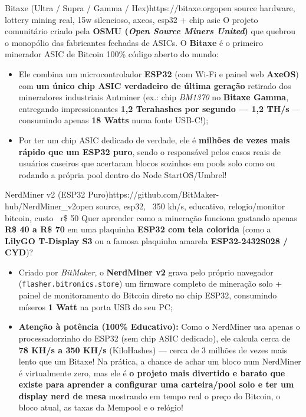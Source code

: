 \documentclass{pousadaguide}
\begin{document}
\begin{ferramenta}[goat,logo=bitaxe]{Bitaxe (Ultra / Supra / Gamma / Hex)}{https://bitaxe.org}{open source hardware, lottery mining real, 15w silencioso, axeos, esp32 + chip asic}
O projeto comunitário criado pela \textbf{OSMU (\emph{Open Source Miners United})} que quebrou o monopólio das fabricantes fechadas de ASICs. O \textbf{Bitaxe} é o primeiro minerador ASIC de Bitcoin 100\% código aberto do mundo:
\begin{itemize}
  \item Ele combina um microcontrolador \textbf{ESP32} (com Wi-Fi e painel web \textbf{AxeOS}) com \textbf{um único chip ASIC verdadeiro de última geração} retirado dos mineradores industriais Antminer (ex.: chip \emph{BM1370} no \textbf{Bitaxe Gamma}, entregando impressionantes \textbf{1,2 Terahashes por segundo — 1,2 TH/s} — consumindo apenas \textbf{18 Watts} numa fonte USB-C!);
  \item Por ter um chip ASIC dedicado de verdade, ele é \textbf{milhões de vezes mais rápido que um ESP32 puro}, sendo o responsável pelos casos reais de usuários caseiros que acertaram blocos sozinhos em pools solo como  ou rodando a própria pool dentro do Node StartOS/Umbrel!
\end{itemize}
\end{ferramenta}

\begin{ferramenta}[recomendado,logo=nerdminer]{NerdMiner v2 (ESP32 Puro)}{https://github.com/BitMaker-hub/NerdMiner_v2}{open source, esp32, ~350 kh/s, educativo, relogio/monitor bitcoin, custo ~r\$ 50}
Quer aprender como a mineração funciona gastando apenas \textbf{R\$ 40 a R\$ 70} em uma plaquinha \textbf{ESP32 com tela colorida} (como a \textbf{LilyGO T-Display S3} ou a famosa plaquinha amarela \textbf{ESP32-2432S028 / CYD})?
\begin{itemize}
  \item Criado por \emph{BitMaker}, o \textbf{NerdMiner v2} grava pelo próprio navegador (\texttt{flasher.bitronics.store}) um firmware completo de mineração solo + painel de monitoramento do Bitcoin direto no chip ESP32, consumindo míseros \textbf{1 Watt} na porta USB do seu PC;
  \item \textbf{Atenção à potência (100\% Educativo):} Como o NerdMiner usa apenas o processadorzinho do ESP32 (sem chip ASIC dedicado), ele calcula cerca de \textbf{78 KH/s a 350 KH/s} (KiloHashes) — cerca de 3 milhões de vezes mais lento que um Bitaxe! Na prática, a chance de achar um bloco num NerdMiner é virtualmente zero, mas ele é \textbf{o projeto mais divertido e barato que existe para aprender a configurar uma carteira/pool solo e ter um display nerd de mesa} mostrando em tempo real o preço do Bitcoin, o bloco atual, as taxas da Mempool e o relógio!
\end{itemize}
\end{ferramenta}
\end{document}
